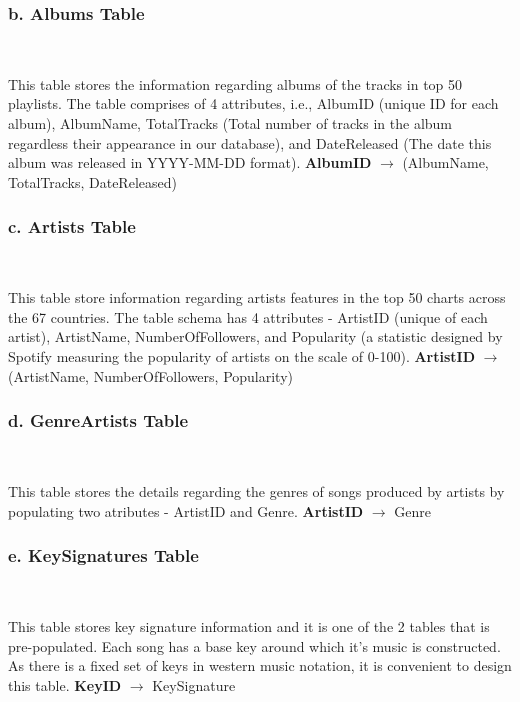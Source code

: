 \documentclass[conference]{IEEEtran}
\begin{document}
\subsubsection*{b. \textbf{Albums} Table} \

This table stores the information regarding albums of the tracks in top 50 playlists. The table comprises of 4 attributes, i.e., AlbumID (unique ID for each album), AlbumName, TotalTracks (Total number of tracks in the album regardless their appearance in our database), and DateReleased (The date this album was released in YYYY-MM-DD format). \linebreak \linebreak
\textbf{AlbumID} $\to$ (AlbumName, TotalTracks, DateReleased) \linebreak

\subsubsection*{c. \textbf{Artists} Table} \

This table store information regarding artists features in the top 50 charts across the 67 countries. The table schema has 4 attributes - ArtistID (unique of each artist), ArtistName, NumberOfFollowers, and Popularity (a statistic designed by Spotify measuring the popularity of artists on the scale of 0-100). \linebreak \linebreak
\textbf{ArtistID} $\to$ (ArtistName, NumberOfFollowers, Popularity) \linebreak

\subsubsection*{d. \textbf{GenreArtists} Table} \

This table stores the details regarding the genres of songs produced by artists by populating two atributes - ArtistID and Genre. \linebreak \linebreak
\textbf{ArtistID} $\to$ Genre \linebreak


\subsubsection*{e. \textbf{KeySignatures} Table} \

This table stores key signature information and it is one of the 2 tables that is pre-populated. Each song has a base key around which it's music is constructed. As there is a fixed set of keys in western music notation, it is convenient to design this table. \linebreak \linebreak
\textbf{KeyID} $\to$ KeySignature \linebreak
\end{document}

